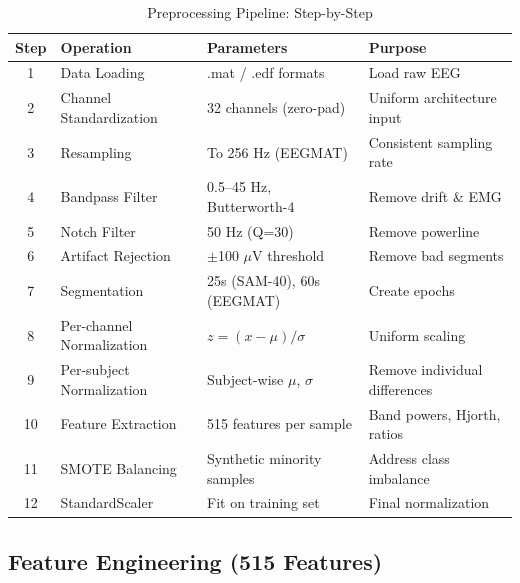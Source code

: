 \documentclass[11pt,a4paper]{article}
\begin{document}
\begin{table}[H]
\centering
\caption{Preprocessing Pipeline: Step-by-Step}
\small
\begin{tabular}{clll}
\toprule
\textbf{Step} & \textbf{Operation} & \textbf{Parameters} & \textbf{Purpose} \\
\midrule
1 & Data Loading & .mat / .edf formats & Load raw EEG \\
2 & Channel Standardization & 32 channels (zero-pad) & Uniform architecture input \\
3 & Resampling & To 256 Hz (EEGMAT) & Consistent sampling rate \\
4 & Bandpass Filter & 0.5--45 Hz, Butterworth-4 & Remove drift \& EMG \\
5 & Notch Filter & 50 Hz (Q=30) & Remove powerline \\
6 & Artifact Rejection & $\pm$100 $\mu$V threshold & Remove bad segments \\
7 & Segmentation & 25s (SAM-40), 60s (EEGMAT) & Create epochs \\
8 & Per-channel Normalization & $z = (x - \mu) / \sigma$ & Uniform scaling \\
9 & Per-subject Normalization & Subject-wise $\mu$, $\sigma$ & Remove individual differences \\
10 & Feature Extraction & 515 features per sample & Band powers, Hjorth, ratios \\
11 & SMOTE Balancing & Synthetic minority samples & Address class imbalance \\
12 & StandardScaler & Fit on training set & Final normalization \\
\bottomrule
\end{tabular}
\end{table}

\subsection{Feature Engineering (515 Features)}
\end{document}
